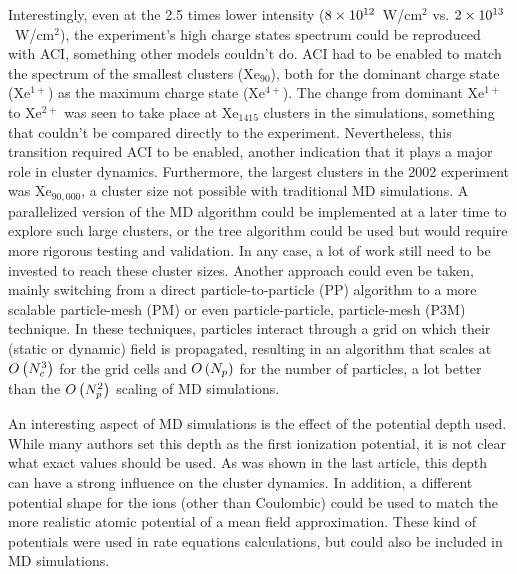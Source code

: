Interestingly, even at the 2.5 times lower intensity ($\ten{8}{12}$~W/cm$^{2}$
vs. $\ten{2}{13}$~W/cm$^{2}$), the experiment's high charge states spectrum
could be reproduced with ACI, something other models couldn't do. ACI had to
be enabled to match the spectrum of the smallest clusters (Xe$_{90}$), both
for the dominant charge state (Xe$^{1+}$) as the maximum charge state (Xe$^{4+}$).
The change from dominant Xe$^{1+}$ to Xe$^{2+}$ was seen to take place at
Xe$_{1415}$ clusters in the simulations, something that couldn't be compared
directly to the experiment. Nevertheless, this transition required ACI to be
enabled, another indication that it plays a major role in cluster dynamics.
Furthermore, the largest clusters in the 2002 experiment was Xe$_{90,000}$, a
cluster size not possible with traditional MD simulations. A parallelized
version of the MD algorithm could be implemented at a later time to explore such
large clusters, or the tree algorithm could be used but would require more
rigorous testing and validation. In any case, a lot of work still need to be
invested to reach these cluster sizes. Another approach could even be taken,
mainly switching from a direct particle-to-particle (PP) algorithm to a more
scalable particle-mesh (PM) or even particle-particle, particle-mesh (P3M)
technique. In these techniques, particles interact through a grid on which their
(static or dynamic) field is propagated, resulting in an algorithm that scales
at $O\left( N_c^3 \right)$ for the grid cells and $O\left( N_p \right)$ for the number of particles,
a lot better than the $O\left( N_p^2 \right)$ scaling of MD simulations.

An interesting aspect of MD simulations is the effect of the potential depth
used. While many authors set this depth as the first ionization potential, it
is not clear what exact values should be used. As was shown in the last article,
this depth can have a strong influence on the cluster dynamics. In addition, a
different potential shape for the ions (other than Coulombic) could be used to
match the more realistic atomic potential of a mean field approximation. These
kind of potentials were used in rate equations calculations, but could also be
included in MD simulations.


